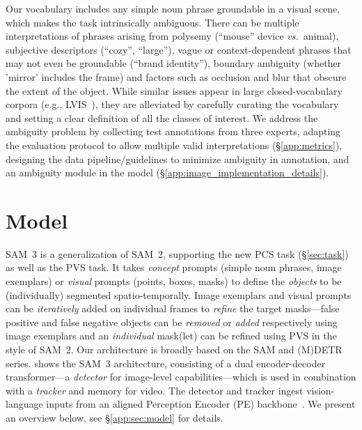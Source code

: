 \documentclass[]{fairmeta}
\newcommand{\eg}{e.g., }
\newcommand{\samtwo}{SAM~2\xspace}
\newcommand{\model}{SAM~3\xspace}
\newcommand{\pvstask}{PVS\xspace}
\newcommand{\task}{PCS\xspace}
\begin{document}
Our vocabulary includes any simple noun phrase groundable in a visual scene, which makes the task intrinsically ambiguous. There can be multiple interpretations of phrases arising from polysemy (“mouse” device \textit{vs.}~animal), subjective descriptors (“cozy”, “large”), vague or context-dependent phrases that may not even be groundable (“brand identity”), boundary ambiguity (whether 'mirror' includes the frame) and factors such as occlusion and blur that obscure the extent of the object.
While similar issues appear in large closed-vocabulary corpora (\eg LVIS~\citep{lvis}), they are alleviated by carefully curating the vocabulary and setting a clear definition of all the classes of interest. 
We address the ambiguity problem by collecting test annotations from three experts, adapting the evaluation protocol to allow multiple valid interpretations (\S\ref{app:metrics}),  designing the data pipeline/guidelines to minimize ambiguity in annotation, and an ambiguity module in the model (\S\ref{app:image_implementation_details}).





\section{Model}
\label{sec:model}

\model is a generalization of \samtwo, supporting the new \task task (\S\ref{sec:task}) as well as the \pvstask task. It takes \textit{concept} prompts (simple noun phrases, image exemplars) or \textit{visual} prompts (points, boxes, masks) to define the \textit{objects} to be (individually) segmented spatio-temporally.
Image exemplars and visual prompts can be \textit{iteratively} added on individual frames to \textit{refine} the target masks---false positive and false negative objects can be \textit{removed} or \textit{added} respectively using image exemplars and an \textit{individual} mask(let) can be refined using \pvstask in the style of \samtwo.
Our architecture is broadly based on the SAM  and (M)DETR 
\citep{carion2020end,kamath2021mdetr} 
series.  shows the \model architecture, consisting of a dual encoder-decoder transformer---a \textit{detector} for image-level capabilities---which is used in combination with a \textit{tracker} and memory for video. The detector and tracker ingest vision-language inputs from an aligned Perception Encoder (PE) backbone~\citep{bolya2025PerceptionEncoder}.  We present an overview below, see \S\ref{app:sec:model} for details.
\end{document}
